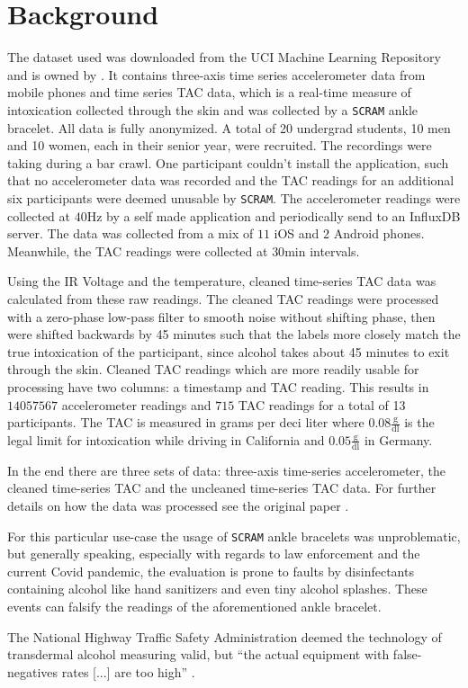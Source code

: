 \section{Background}
The dataset used was downloaded from the UCI Machine Learning Repository \cite{Dua:2019} and is owned by \citeauthor{DBLP:conf/ijcai/KillianPNMC19} \cite{DBLP:conf/ijcai/KillianPNMC19}.
It contains three-axis time series accelerometer data from mobile phones and time series TAC data, which is a real-time measure of intoxication collected through the skin and was collected by a \texttt{SCRAM} ankle bracelet.
All data is fully anonymized.
A total of 20 undergrad students, 10 men and 10 women, each in their senior year, were recruited. The recordings were taking during a bar crawl.
One participant couldn't install the application, such that no accelerometer data was recorded and the TAC readings for an additional six participants were deemed unusable by \texttt{SCRAM}.
The accelerometer readings were collected at $40 \si{\hertz}$ by a self made application and periodically send to an InfluxDB server.
The data was collected from a mix of $11$ iOS and $2$ Android phones.
Meanwhile, the TAC readings were collected at $30\si{\minute}$ intervals.

Using the IR Voltage and the temperature, cleaned time-series TAC data was calculated from these raw readings.
The cleaned TAC readings were processed with a zero-phase low-pass filter to smooth noise without shifting phase, then were shifted backwards by 45 minutes such that the labels more closely match the true intoxication of the participant, since alcohol takes about 45 minutes to exit through the skin.
Cleaned TAC readings which are more readily usable for processing have two columns: a timestamp and TAC reading. 
This results in $14 057 567$ accelerometer readings and $715$ TAC readings for a total of 13 participants.
The TAC is measured in grams per deci liter where $0.08 \frac{\si{\gram}}{\si{\deci\litre}}$ is the legal limit for intoxication while driving in California and $0.05 \frac{\si{\gram}}{\si{\deci\litre}}$ in Germany.

In the end there are three sets of data: three-axis time-series accelerometer, the cleaned time-series TAC and the uncleaned time-series TAC data.
For further details on how the data was processed see the original paper \cite{DBLP:conf/ijcai/KillianPNMC19}.

For this particular use-case the usage of \texttt{SCRAM} ankle bracelets was unproblematic, but generally speaking, especially with regards to law enforcement and the current Covid pandemic, the evaluation is prone to faults by disinfectants containing alcohol like hand sanitizers and even tiny alcohol splashes. These events can falsify the readings of the aforementioned ankle bracelet. 

The National Highway Traffic Safety Administration deemed the technology of transdermal alcohol measuring valid, but ``the actual equipment with false-negatives rates [...] are too high'' \cite{nhtsa_scram}. 


